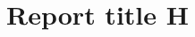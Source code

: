 \documentclass[final]{hcmut-thesis}
\title{Report title H}
\begin{document}
\coverpage%
\clearpage
\end{document}
